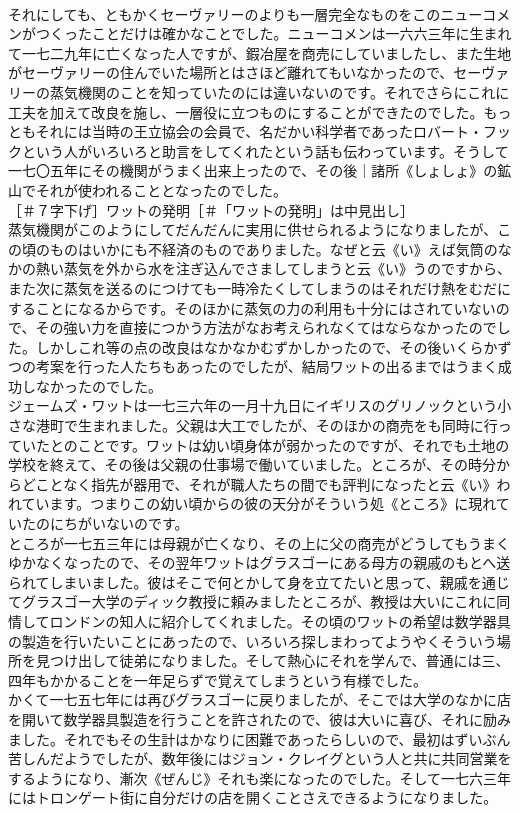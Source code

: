 \documentclass[8pt]{extreport}
\begin{document}
\begin{CJK}{UTF8}{min}
\\	それにしても、ともかくセーヴァリーのよりも一層完全なものをこのニューコメンがつくったことだけは確かなことでした。ニューコメンは一六六三年に生まれて一七二九年に亡くなった人ですが、鍜冶屋を商売にしていましたし、また生地がセーヴァリーの住んでいた場所とはさほど離れてもいなかったので、セーヴァリーの蒸気機関のことを知っていたのには違いないのです。それでさらにこれに工夫を加えて改良を施し、一層役に立つものにすることができたのでした。もっともそれには当時の王立協会の会員で、名だかい科学者であったロバート・フックという人がいろいろと助言をしてくれたという話も伝わっています。そうして一七〇五年にその機関がうまく出来上ったので、その後｜諸所《しょしょ》の鉱山でそれが使われることとなったのでした。
\\	［＃７字下げ］ワットの発明［＃「ワットの発明」は中見出し］
\\	蒸気機関がこのようにしてだんだんに実用に供せられるようになりましたが、この頃のものはいかにも不経済のものでありました。なぜと云《い》えば気筒のなかの熱い蒸気を外から水を注ぎ込んでさましてしまうと云《い》うのですから、また次に蒸気を送るのにつけても一時冷たくしてしまうのはそれだけ熱をむだにすることになるからです。そのほかに蒸気の力の利用も十分にはされていないので、その強い力を直接につかう方法がなお考えられなくてはならなかったのでした。しかしこれ等の点の改良はなかなかむずかしかったので、その後いくらかずつの考案を行った人たちもあったのでしたが、結局ワットの出るまではうまく成功しなかったのでした。
\\	ジェームズ・ワットは一七三六年の一月十九日にイギリスのグリノックという小さな港町で生まれました。父親は大工でしたが、そのほかの商売をも同時に行っていたとのことです。ワットは幼い頃身体が弱かったのですが、それでも土地の学校を終えて、その後は父親の仕事場で働いていました。ところが、その時分からどことなく指先が器用で、それが職人たちの間でも評判になったと云《い》われています。つまりこの幼い頃からの彼の天分がそういう処《ところ》に現れていたのにちがいないのです。
\\	ところが一七五三年には母親が亡くなり、その上に父の商売がどうしてもうまくゆかなくなったので、その翌年ワットはグラスゴーにある母方の親戚のもとへ送られてしまいました。彼はそこで何とかして身を立てたいと思って、親戚を通じてグラスゴー大学のディック教授に頼みましたところが、教授は大いにこれに同情してロンドンの知人に紹介してくれました。その頃のワットの希望は数学器具の製造を行いたいことにあったので、いろいろ探しまわってようやくそういう場所を見つけ出して徒弟になりました。そして熱心にそれを学んで、普通には三、四年もかかることを一年足らずで覚えてしまうという有様でした。
\\	かくて一七五七年には再びグラスゴーに戻りましたが、そこでは大学のなかに店を開いて数学器具製造を行うことを許されたので、彼は大いに喜び、それに励みました。それでもその生計はかなりに困難であったらしいので、最初はずいぶん苦しんだようでしたが、数年後にはジョン・クレイグという人と共に共同営業をするようになり、漸次《ぜんじ》それも楽になったのでした。そして一七六三年にはトロンゲート街に自分だけの店を開くことさえできるようになりました。

\end{CJK}
\end{document}
